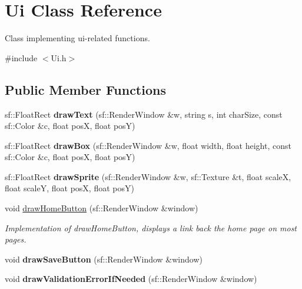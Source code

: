 \hypertarget{class_ui}{}\section{Ui Class Reference}
\label{class_ui}


Class implementing ui-\/related functions.  




{\ttfamily \#include $<$Ui.\+h$>$}

\subsection*{Public Member Functions}
\begin{DoxyCompactItemize}
\item 
\hypertarget{class_ui_ad8acc5f549b6e73992d53f8c9d108bcd}{}\label{class_ui_ad8acc5f549b6e73992d53f8c9d108bcd} 
sf\+::\+Float\+Rect {\bfseries draw\+Text} (sf\+::\+Render\+Window \&w, string s, int char\+Size, const sf\+::\+Color \&c, float posX, float posY)
\item 
\hypertarget{class_ui_a516120a807ef5abffeb0640acb538530}{}\label{class_ui_a516120a807ef5abffeb0640acb538530} 
sf\+::\+Float\+Rect {\bfseries draw\+Box} (sf\+::\+Render\+Window \&w, float width, float height, const sf\+::\+Color \&c, float posX, float posY)
\item 
\hypertarget{class_ui_ab2bd2a485d96f6b47dab43a3f1d1bda2}{}\label{class_ui_ab2bd2a485d96f6b47dab43a3f1d1bda2} 
sf\+::\+Float\+Rect {\bfseries draw\+Sprite} (sf\+::\+Render\+Window \&w, sf\+::\+Texture \&t, float scaleX, float scaleY, float posX, float posY)
\item 
\hypertarget{class_ui_a81f4f16789c5862949453bc906d3757b}{}\label{class_ui_a81f4f16789c5862949453bc906d3757b} 
void \hyperlink{class_ui_a81f4f16789c5862949453bc906d3757b}{draw\+Home\+Button} (sf\+::\+Render\+Window \&window)
\begin{DoxyCompactList}\small\item\em Implementation of draw\+Home\+Button, displays a link back the home page on most pages. \end{DoxyCompactList}\item 
\hypertarget{class_ui_a7b521d5a8b4fc39bf989d3d6c71c8cb6}{}\label{class_ui_a7b521d5a8b4fc39bf989d3d6c71c8cb6} 
void {\bfseries draw\+Save\+Button} (sf\+::\+Render\+Window \&window)
\item 
\hypertarget{class_ui_a0a6f6cdcea417f9963da392ba053ca20}{}\label{class_ui_a0a6f6cdcea417f9963da392ba053ca20} 
void {\bfseries draw\+Validation\+Error\+If\+Needed} (sf\+::\+Render\+Window \&window)

\end{DoxyCompactItemize}

